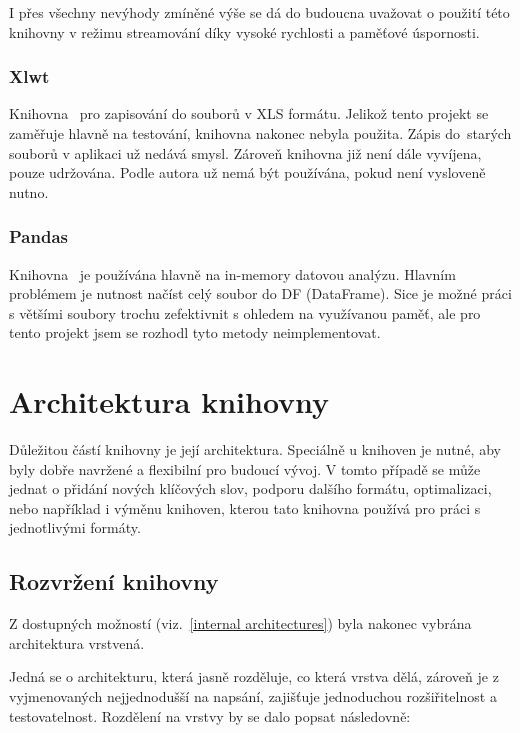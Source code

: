 I přes všechny nevýhody zmíněné výše se dá do budoucna uvažovat o použití této knihovny v režimu streamování díky vysoké rychlosti a paměťové úspornosti.

\subsubsection{Xlwt}
\label{xlwt}

Knihovna~\cite{xlwt} pro zapisování do souborů v XLS formátu. Jelikož tento projekt se zaměřuje hlavně na testování, knihovna nakonec nebyla použita. Zápis do~starých souborů v aplikaci už nedává smysl. Zároveň knihovna již není dále vyvíjena, pouze udržována. Podle autora už nemá být používána, pokud není vysloveně nutno.~\cite{xlwtEnd}

\subsubsection{Pandas}
\label{subsubsec:pandas}

Knihovna~\cite{Pandas} je používána hlavně na in-memory datovou analýzu. Hlavním problémem je nutnost načíst celý soubor do DF (DataFrame). Sice je možné práci s většími soubory trochu zefektivnit s ohledem na využívanou paměť, ale pro tento projekt jsem se rozhodl tyto metody neimplementovat.~\cite{PandasScale}

\section{Architektura knihovny}

Důležitou částí knihovny je její architektura. Speciálně u knihoven je nutné, aby byly dobře navržené a flexibilní pro budoucí vývoj. V tomto případě se může jednat o přidání nových klíčových slov, podporu dalšího formátu, optimalizaci, nebo například i výměnu knihoven, kterou tato knihovna používá pro práci s jednotlivými formáty.

\subsection{Rozvržení knihovny}

Z dostupných možností (viz.~\ref{internal architectures}) byla nakonec vybrána architektura vrstvená.

Jedná se o architekturu, která jasně rozděluje, co která vrstva dělá, zároveň je z vyjmenovaných nejjednodušší na napsání, zajišťuje jednoduchou rozšiřitelnost a testovatelnost. Rozdělení na vrstvy by se dalo popsat následovně:

